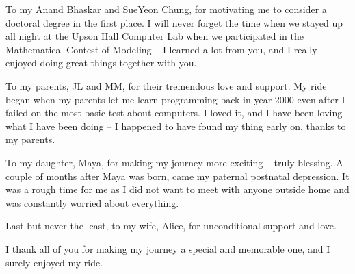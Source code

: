 To my Anand Bhaskar and SueYeon Chung, for motivating me to consider a doctoral degree in the first place. I will never forget the time when we stayed up all night at the Upson Hall Computer Lab when we participated in the Mathematical Contest of Modeling -- I learned a lot from you, and I really enjoyed doing great things together with you. 

To my parents, JL and MM, for their tremendous love and support. My ride began when my parents let me learn programming back in year 2000 even after I failed on the most basic test about computers. I loved it, and I have been loving what I have been doing -- I happened to have found my thing early on, thanks to my parents. 

To my daughter, Maya, for making my journey more exciting -- truly blessing. A couple of months after Maya was born, came my paternal postnatal depression. It was a rough time for me as I did not want to meet with anyone outside home and was constantly worried about everything. 



Last but never the least, to my wife, Alice, for unconditional support and love.

I thank all of you for making my journey a special and memorable one, and I surely enjoyed my ride.


